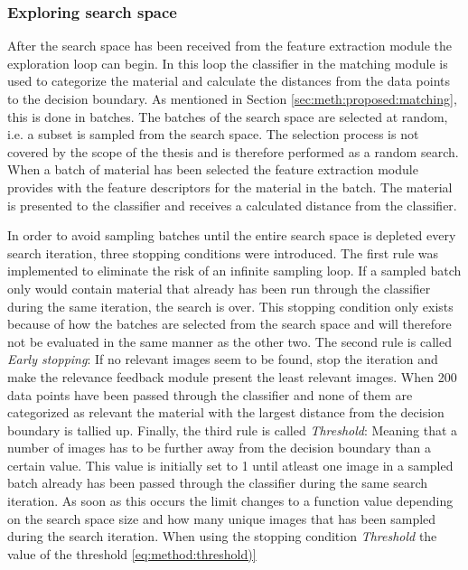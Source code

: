 \subsubsection{Exploring search space}
\label{sec:method:proposed:matching:search}
After the search space has been received from the feature extraction module the exploration loop can begin. In this loop the classifier in the matching module is used to categorize the material and calculate the distances from the data points to the decision boundary. As mentioned in Section \ref{sec:meth:proposed:matching}, this is done in batches. The batches of the search space are selected at random, i.e. a subset is sampled from the search space. The selection process is not covered by the scope of the thesis and is therefore performed as a random search. When a batch of material has been selected the feature extraction module provides with the feature descriptors for the material in the batch. The material is presented to the classifier and receives a calculated distance from the classifier. 

In order to avoid sampling batches until the entire search space is depleted every search iteration, three stopping conditions were introduced. The first rule was implemented to eliminate the risk of an infinite sampling loop. If a sampled batch only would contain material that already has been run through the classifier during the same iteration, the search is over. This stopping condition only exists because of how the batches are selected from the search space and will therefore not be evaluated in the same manner as the other two. The second rule is called \emph{Early stopping}: If no relevant images seem to be found, stop the iteration and make the relevance feedback module present the least relevant images. When 200 data points have been passed through the classifier and none of them are categorized as relevant the material with the largest distance from the decision boundary is tallied up. Finally, the third rule is called \emph{Threshold}: Meaning that a number of images has to be further away from the decision boundary than a certain value. This value is initially set to 1 until atleast one image in a sampled batch already has been passed through the classifier during the same search iteration. As soon as this occurs the limit changes to a function value depending on the search space size and how many unique images that has been sampled during the search iteration. When using the stopping condition \emph{Threshold} the value of the threshold \ref{eq:method:threshold)}

